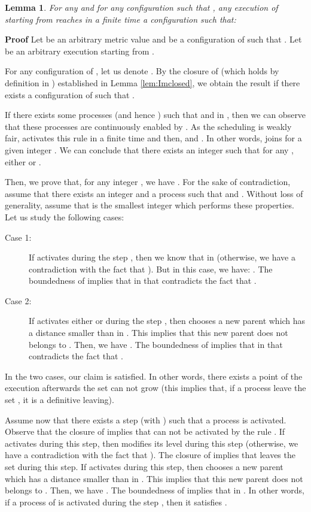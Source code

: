 \documentclass[11pt]{article}
\newenvironment{proof}{\noindent\textbf{Proof}}{\hfill\qed}
\newcommand{\qed}{\hfill}
\newtheorem{lem}{Lemma}
\newenvironment{lemma}[1]{\vspace{-0.25cm}\begin{lem}#1}{\end{lem}\vspace{-0.3cm}}
\begin{document}
\begin{lemma}\label{lem:distDtolevelmi}
For any  and for any configuration  such that
, any execution of  starting from  reaches in a finite time a configuration such that:

\end{lemma}

\begin{proof}
Let  be an arbitrary metric value and  be a configuration of  such that . Let  be an arbitrary execution starting from .

For any configuration  of , let us denote . By the closure of  (which holds by definition in ) established in Lemma \ref{lem:Imclosed}, we obtain the result if there exists a configuration  of  such that .

If there exists some processes  (and hence ) such that  and  in , then we can observe that these processes are continuously enabled by . As the scheduling is weakly fair,  activates this rule in a finite time and then,  and . In other words,  joins  for a given integer . We can conclude that there exists an integer  such that for any , either  or .

Then, we prove that, for any integer , we have . For the sake of contradiction, assume that there exists an integer  and a process  such that  and . Without loss of generality, assume that  is the smallest integer which performs these properties. Let us study the following cases:
\begin{description}
\item[Case 1:] If  activates  during the step , then we know that  in  (otherwise, we have a contradiction with the fact that ). But in this case, we have: . The boundedness of  implies that  in  that contradicts the fact that .
\item[Case 2:] If  activates either  or  during the step , then  chooses a new parent which has a distance smaller than  in . This implies that this new parent does not belongs to . Then, we have . The boundedness of  implies that  in  that contradicts the fact that .
\end{description}
In the two cases, our claim is satisfied. In other words, there exists a point of the execution afterwards the set  can not grow (this implies that, if a process leave the set , it is a definitive leaving).

Assume now that there exists a step  (with ) such that a process  is activated. Observe that the closure of  implies that  can not be activated by the rule . If  activates  during this step, then  modifies its level during this step (otherwise, we have a contradiction with the fact that ). The closure of  implies that  leaves the set  during this step. If  activates  during this step, then  chooses a new parent which has a distance smaller than  in . This implies that this new parent does not belongs to . Then, we have . The boundedness of  implies that  in . In other words, if a process of  is activated during the step , then it satisfies .


\end{proof}
\end{document}
